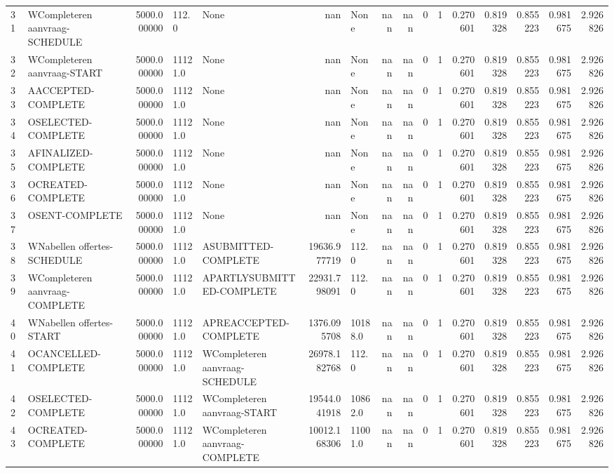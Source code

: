 \begin{tabular}{llrllrlrrrrrrrrr}
31 & W\-Completeren aanvraag-SCHEDULE & 5000.000000 & 112.0 & None & nan & None & nan & nan & 0 & 1 & 0.270601 & 0.819328 & 0.855223 & 0.981675 & 2.926826 \\
32 & W\-Completeren aanvraag-START & 5000.000000 & 11121.0 & None & nan & None & nan & nan & 0 & 1 & 0.270601 & 0.819328 & 0.855223 & 0.981675 & 2.926826 \\
33 & A\-ACCEPTED-COMPLETE & 5000.000000 & 11121.0 & None & nan & None & nan & nan & 0 & 1 & 0.270601 & 0.819328 & 0.855223 & 0.981675 & 2.926826 \\
34 & O\-SELECTED-COMPLETE & 5000.000000 & 11121.0 & None & nan & None & nan & nan & 0 & 1 & 0.270601 & 0.819328 & 0.855223 & 0.981675 & 2.926826 \\
35 & A\-FINALIZED-COMPLETE & 5000.000000 & 11121.0 & None & nan & None & nan & nan & 0 & 1 & 0.270601 & 0.819328 & 0.855223 & 0.981675 & 2.926826 \\
36 & O\-CREATED-COMPLETE & 5000.000000 & 11121.0 & None & nan & None & nan & nan & 0 & 1 & 0.270601 & 0.819328 & 0.855223 & 0.981675 & 2.926826 \\
37 & O\-SENT-COMPLETE & 5000.000000 & 11121.0 & None & nan & None & nan & nan & 0 & 1 & 0.270601 & 0.819328 & 0.855223 & 0.981675 & 2.926826 \\
38 & W\-Nabellen offertes-SCHEDULE & 5000.000000 & 11121.0 & A\-SUBMITTED-COMPLETE & 19636.977719 & 112.0 & nan & nan & 0 & 1 & 0.270601 & 0.819328 & 0.855223 & 0.981675 & 2.926826 \\
39 & W\-Completeren aanvraag-COMPLETE & 5000.000000 & 11121.0 & A\-PARTLYSUBMITTED-COMPLETE & 22931.798091 & 112.0 & nan & nan & 0 & 1 & 0.270601 & 0.819328 & 0.855223 & 0.981675 & 2.926826 \\
40 & W\-Nabellen offertes-START & 5000.000000 & 11121.0 & A\-PREACCEPTED-COMPLETE & 1376.095708 & 10188.0 & nan & nan & 0 & 1 & 0.270601 & 0.819328 & 0.855223 & 0.981675 & 2.926826 \\
41 & O\-CANCELLED-COMPLETE & 5000.000000 & 11121.0 & W\-Completeren aanvraag-SCHEDULE & 26978.182768 & 112.0 & nan & nan & 0 & 1 & 0.270601 & 0.819328 & 0.855223 & 0.981675 & 2.926826 \\
42 & O\-SELECTED-COMPLETE & 5000.000000 & 11121.0 & W\-Completeren aanvraag-START & 19544.041918 & 10862.0 & nan & nan & 0 & 1 & 0.270601 & 0.819328 & 0.855223 & 0.981675 & 2.926826 \\
43 & O\-CREATED-COMPLETE & 5000.000000 & 11121.0 & W\-Completeren aanvraag-COMPLETE & 10012.168306 & 11001.0 & nan & nan & 0 & 1 & 0.270601 & 0.819328 & 0.855223 & 0.981675 & 2.926826 \\

\end{tabular}
